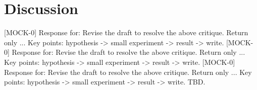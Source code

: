 \documentclass{article}
\begin{document}
\section{Discussion}
[MOCK-0] Response for: Revise the draft to resolve the above critique. Return only ...
Key points: hypothesis -> small experiment -> result -> write.
[MOCK-0] Response for: Revise the draft to resolve the above critique. Return only ...
Key points: hypothesis -> small experiment -> result -> write.
[MOCK-0] Response for: Revise the draft to resolve the above critique. Return only ...
Key points: hypothesis -> small experiment -> result -> write.
TBD.



\end{document}
